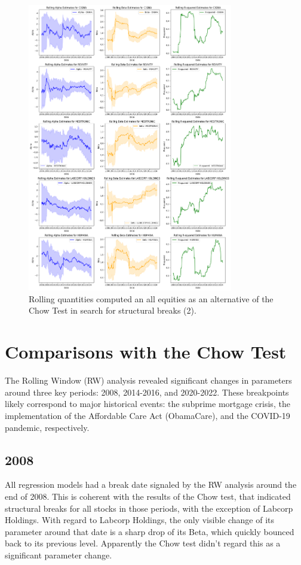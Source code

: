 \begin{figure}[p]
    \centering
    \includegraphics[width=0.8\textwidth]{images/rolling_quantities_2.png}
    \caption{Rolling quantities computed an all equities as an alternative of the Chow Test in search for structural
    breaks (2).}\label{fig:rolling_quantities_2}
\end{figure}

\section{Comparisons with the Chow Test}

The Rolling Window (RW) analysis revealed significant changes in parameters around three key periods: 2008, 2014-2016, and 
2020-2022. These breakpoints likely correspond to major historical events: the subprime mortgage crisis, the implementation of 
the Affordable Care Act (ObamaCare), and the COVID-19 pandemic, respectively.

\subsection{2008}

All regression models had a break date signaled by the RW analysis around the end of 
2008. This is coherent with the results of the Chow test, that indicated structural breaks 
for all stocks in those periods, with the exception of Labcorp Holdings. 
With regard to Labcorp Holdings, the only visible change of its parameter around that 
date is a sharp drop of its Beta, which quickly bounced back to its previous level.  
Apparently the Chow test didn't regard this as a significant parameter change.

